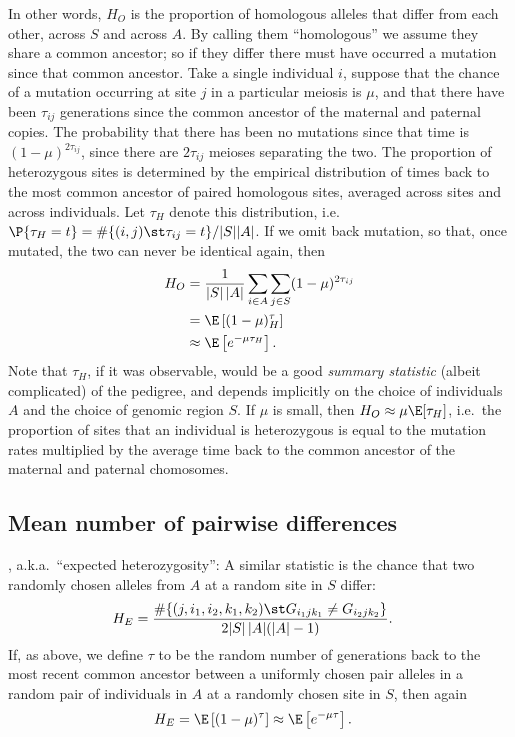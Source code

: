 In other words, $H_O$ is the proportion of homologous alleles that differ from each other, across $S$ and across $A$.
By calling them ``homologous'' we assume they share a common ancestor;
so if they differ there must have occurred a mutation since that common ancestor.
Take a single individual $i$,
suppose that the chance of a mutation occurring at site $j$ in a particular meiosis is $\mu$,
and that there have been $\tau_{ij}$ generations since the common ancestor of the maternal and paternal copies.
The probability that there has been no mutations since that time is $(1-\mu)^{2 \tau_{ij}}$,
since there are $2 \tau_{ij}$ meioses separating the two.
The proportion of heterozygous sites is determined by the empirical distribution 
of times back to the most common ancestor of paired homologous sites, averaged across sites and across individuals.
Let $\tau_H$ denote this distribution, i.e.\ $\P\{ \tau_H = t \} = \#\{ (i,j) \st \tau_{ij} = t \} / |S||A|$.
If we omit back mutation, so that, once mutated, the two can never be identical again,
then
\begin{align}
  H_O &= \frac{1}{|S|\,|A|} \sum_{i \in A} \sum_{j \in S} (1-\mu)^{2 \tau_{ij}} \\
    &= \E\left[ (1-\mu)^\tau_H \right] \\
    &\approx \E\left[ e^{-\mu \tau_H } \right] .
\end{align}
Note that $\tau_H$, if it was observable, would be a good \emph{summary statistic} (albeit complicated) of the pedigree,
and depends implicitly on the choice of individuals $A$ and the choice of genomic region $S$.
If $\mu$ is small, then $H_O \approx \mu \E[ \tau_H ]$,
i.e.\ the proportion of sites that an individual is heterozygous
is equal to the mutation rates multiplied by the average time back to the common ancestor of the maternal and paternal chomosomes.



\subsection{Mean number of pairwise differences}, a.k.a.\ ``expected heterozygosity'':
A similar statistic is the chance that two randomly chosen alleles from $A$ at a random site in $S$ differ:
\begin{align}
  H_E &= \frac{ \#\{ (j,i_1,i_2,k_1,k_2) \st G_{i_1jk_1} \neq G_{i_2jk_2}  \} }{2|S|\,|A|(|A|-1)}  .
\end{align}
If, as above, we define $\tau$ to be the random number of generations back to the most recent common ancestor
between a uniformly chosen pair alleles in a random pair of individuals in $A$ at a randomly chosen site in $S$,
then again
\begin{align}
  H_E &= \E\left[ (1-\mu)^\tau \right] \approx \E\left[ e^{-\mu \tau} \right] .
\end{align}


